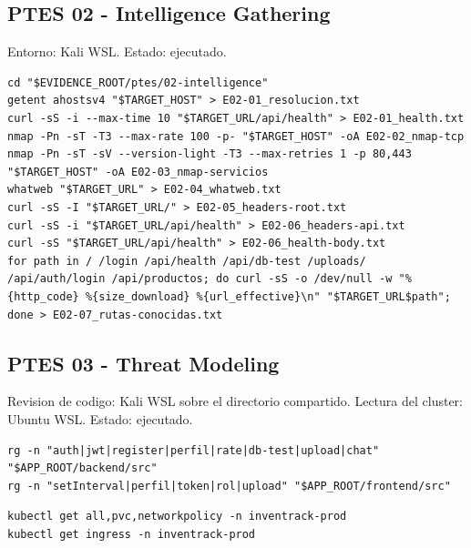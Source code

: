\subsection{PTES 02 - Intelligence Gathering}\label{ptes-02---intelligence-gathering}

Entorno: Kali WSL. Estado: ejecutado.

\begin{tcolorbox}[codebox]
\begin{Verbatim}[fontsize=\scriptsize,breaklines=true,breakanywhere=true]
cd "$EVIDENCE_ROOT/ptes/02-intelligence"
getent ahostsv4 "$TARGET_HOST" > E02-01_resolucion.txt
curl -sS -i --max-time 10 "$TARGET_URL/api/health" > E02-01_health.txt
nmap -Pn -sT -T3 --max-rate 100 -p- "$TARGET_HOST" -oA E02-02_nmap-tcp
nmap -Pn -sT -sV --version-light -T3 --max-retries 1 -p 80,443 "$TARGET_HOST" -oA E02-03_nmap-servicios
whatweb "$TARGET_URL" > E02-04_whatweb.txt
curl -sS -I "$TARGET_URL/" > E02-05_headers-root.txt
curl -sS -i "$TARGET_URL/api/health" > E02-06_headers-api.txt
curl -sS "$TARGET_URL/api/health" > E02-06_health-body.txt
for path in / /login /api/health /api/db-test /uploads/ /api/auth/login /api/productos; do curl -sS -o /dev/null -w "%{http_code} %{size_download} %{url_effective}\n" "$TARGET_URL$path"; done > E02-07_rutas-conocidas.txt
\end{Verbatim}
\end{tcolorbox}

\subsection{PTES 03 - Threat Modeling}\label{ptes-03---threat-modeling}

Revision de codigo: Kali WSL sobre el directorio compartido. Lectura del cluster: Ubuntu WSL. Estado: ejecutado.

\begin{tcolorbox}[codebox]
\begin{Verbatim}[fontsize=\scriptsize,breaklines=true,breakanywhere=true]
rg -n "auth|jwt|register|perfil|rate|db-test|upload|chat" "$APP_ROOT/backend/src"
rg -n "setInterval|perfil|token|rol|upload" "$APP_ROOT/frontend/src"
\end{Verbatim}
\end{tcolorbox}

\begin{tcolorbox}[codebox]
\begin{Verbatim}[fontsize=\scriptsize,breaklines=true,breakanywhere=true]
kubectl get all,pvc,networkpolicy -n inventrack-prod
kubectl get ingress -n inventrack-prod
\end{Verbatim}
\end{tcolorbox}

